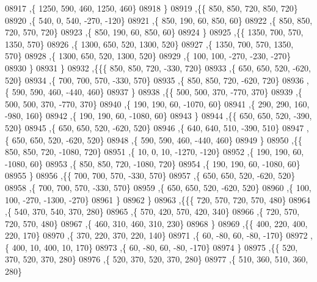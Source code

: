 \begin{DoxyCode}
08917     ,\{  1250,   590,   460,  1250,   460\}
08918     \}
08919    ,\{\{   850,   850,   720,   850,   720\}
08920     ,\{   540,     0,   540,  -270,  -120\}
08921     ,\{   850,   190,    60,   850,    60\}
08922     ,\{   850,   850,   720,   570,   720\}
08923     ,\{   850,   190,    60,   850,    60\}
08924     \}
08925    ,\{\{  1350,   700,   570,  1350,   570\}
08926     ,\{  1300,   650,   520,  1300,   520\}
08927     ,\{  1350,   700,   570,  1350,   570\}
08928     ,\{  1300,   650,   520,  1300,   520\}
08929     ,\{   100,   100,  -270,  -230,  -270\}
08930     \}
08931    \}
08932   ,\{\{\{   850,   850,   720,  -330,   720\}
08933     ,\{   650,   650,   520,  -620,   520\}
08934     ,\{   700,   700,   570,  -330,   570\}
08935     ,\{   850,   850,   720,  -620,   720\}
08936     ,\{   590,   590,   460,  -440,   460\}
08937     \}
08938    ,\{\{   500,   500,   370,  -770,   370\}
08939     ,\{   500,   500,   370,  -770,   370\}
08940     ,\{   190,   190,    60, -1070,    60\}
08941     ,\{   290,   290,   160,  -980,   160\}
08942     ,\{   190,   190,    60, -1080,    60\}
08943     \}
08944    ,\{\{   650,   650,   520,  -390,   520\}
08945     ,\{   650,   650,   520,  -620,   520\}
08946     ,\{   640,   640,   510,  -390,   510\}
08947     ,\{   650,   650,   520,  -620,   520\}
08948     ,\{   590,   590,   460,  -440,   460\}
08949     \}
08950    ,\{\{   850,   850,   720, -1080,   720\}
08951     ,\{    10,     0,    10, -1270,  -120\}
08952     ,\{   190,   190,    60, -1080,    60\}
08953     ,\{   850,   850,   720, -1080,   720\}
08954     ,\{   190,   190,    60, -1080,    60\}
08955     \}
08956    ,\{\{   700,   700,   570,  -330,   570\}
08957     ,\{   650,   650,   520,  -620,   520\}
08958     ,\{   700,   700,   570,  -330,   570\}
08959     ,\{   650,   650,   520,  -620,   520\}
08960     ,\{   100,   100,  -270, -1300,  -270\}
08961     \}
08962    \}
08963   ,\{\{\{   720,   570,   720,   570,   480\}
08964     ,\{   540,   370,   540,   370,   280\}
08965     ,\{   570,   420,   570,   420,   340\}
08966     ,\{   720,   570,   720,   570,   480\}
08967     ,\{   460,   310,   460,   310,   230\}
08968     \}
08969    ,\{\{   400,   220,   400,   220,   170\}
08970     ,\{   370,   220,   370,   220,   140\}
08971     ,\{    60,   -80,    60,   -80,  -170\}
08972     ,\{   400,    10,   400,    10,   170\}
08973     ,\{    60,   -80,    60,   -80,  -170\}
08974     \}
08975    ,\{\{   520,   370,   520,   370,   280\}
08976     ,\{   520,   370,   520,   370,   280\}
08977     ,\{   510,   360,   510,   360,   280\}

\end{DoxyCode}

